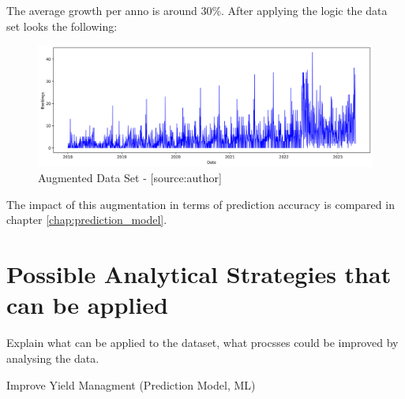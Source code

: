 The average growth per anno is around 30\%. After applying the logic the data set looks the following:  
\begin{figure}[H]
	\centering
		\includegraphics[width=14cm]{images/with_augmentation}
	\caption{Augmented Data Set - [source:author]}
	\label{fig:noAug}
\end{figure}
The impact of this augmentation in terms of prediction accuracy is compared in chapter \ref{chap:prediction_model}.

\section{Possible Analytical Strategies that can be applied }

Explain what can be applied to the dataset, what procsses could be improved by analysing the data. 

Improve Yield Managment  (Prediction Model, ML) 

